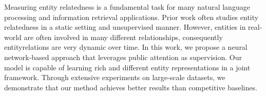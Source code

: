 Measuring entity relatedness is a fundamental task for many natural language processing and information retrieval applications. Prior work often studies entity relatedness in a static setting and unsupervised manner. However, entities in real-world are often involved in many different relationships, consequently entityrelations are very dynamic over time. In this work, we propose a neural network-based approach that leverages public attention as supervision. Our model is capable of learning rich and different entity representations in a joint framework. Through extensive experiments on large-scale datasets, we demonstrate that our method achieves better results than competitive baselines.
